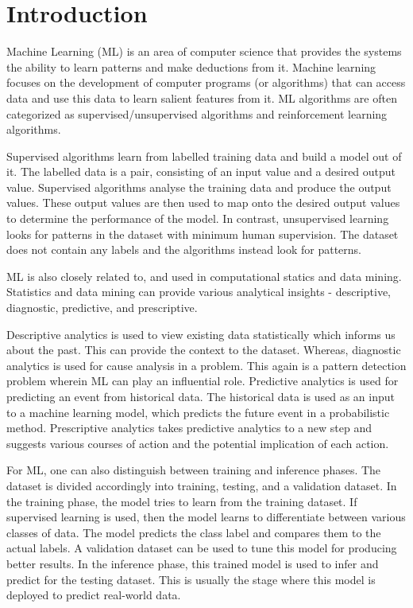 \chapter{Introduction}
\label{chap:Introduction}

Machine Learning (ML) is an area of computer science that provides the systems the ability to learn patterns and make deductions from it. Machine learning focuses on the development of computer programs (or algorithms) that can access data and use this data to learn salient features from it. ML algorithms are often categorized as supervised/unsupervised algorithms and reinforcement learning algorithms. 

Supervised algorithms learn from labelled training data and build a model out of it. The labelled data is a pair, consisting of an input value and a desired output value. Supervised algorithms analyse the training data and produce the output values. These output values are then used to map onto the desired output values to determine the performance of the model. In contrast, unsupervised learning looks for patterns in the dataset with minimum human supervision. The dataset does not contain any labels and the algorithms instead look for patterns.  

ML is also closely related to, and used in computational statics and data mining. Statistics and data mining can provide various analytical insights - descriptive, diagnostic, predictive, and prescriptive. 

Descriptive analytics is used to view existing data statistically which informs us about the past. This can provide the context to the dataset. Whereas, diagnostic analytics is used for cause analysis in a problem. This again is a pattern detection problem wherein ML can play an influential role. Predictive analytics is used for predicting an event from historical data. The historical data is used as an input to a machine learning model, which predicts the future event in a probabilistic method. Prescriptive analytics takes predictive analytics to a new step and suggests various courses of action and the potential implication of each action. 

For ML, one can also distinguish between training and inference phases. The dataset is divided accordingly into training, testing, and a validation dataset. In the training phase, the model tries to learn from the training dataset. If supervised learning is used, then the model learns to differentiate between various classes of data. The model predicts the class label and compares them to the actual labels. A validation dataset can be used to tune this model for producing better results. In the inference phase, this trained model is used to infer and predict for the testing dataset. This is usually the stage where this model is deployed to predict real-world data.

